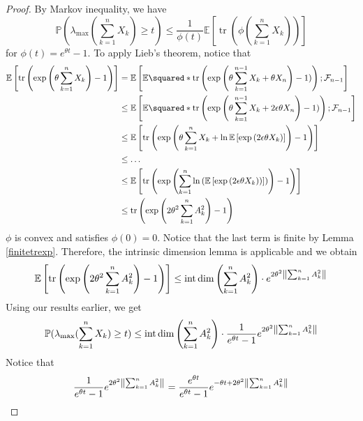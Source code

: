 \begin{proof}
    By Markov inequality, we have 
    \[ \mathbb{P}(\lambda_{\text{max}} (\sum_{k=1}^{n}X_k) \geq t) \leq \frac{1}{\phi(t)} \mathbb{E}\left[\operatorname{tr}\left(\phi(\sum_{k=1}^{n}X_k)\right)\right] \]
    for \( \phi(t) = e^{\theta t}-1\). To apply Lieb's theorem, notice that
    \begin{align*}
      \mathbb{E}\left[\operatorname{tr}\left(\operatorname{exp}\left(\theta \sum_{k=1}^{n} X_k\right)-1\right)\right] &= \mathbb{E}\left[ \mathbb{E}\squared*{\operatorname{tr}\left(\operatorname{exp}\left(\theta \sum_{k=1}^{n-1}X_k+\theta X_n\right)-1)\right);\mathcal{F}_{n-1}}\right] \\
      &\leq \mathbb{E}\left[ \mathbb{E}\squared*{\operatorname{tr}\left(\operatorname{exp}\left(\theta \sum_{k=1}^{n-1}X_k+2 \epsilon \theta X_n\right)-1)\right);\mathcal{F}_{n-1}}\right] \\                                      & \leq \mathbb{E}\left[\operatorname{tr}\left(\operatorname{exp}\left(\theta \sum_{k=1}^{n}X_k+ \operatorname{ln} \mathbb{E}\left[\operatorname{exp}\left(2 \epsilon\theta X_k\right)\right]\right)-1\right)\right] \\
                      & \leq \dots \\
                      & \leq \mathbb{E}\left[\operatorname{tr}\left(\operatorname{exp}\left(\sum_{k=1}^{n} \operatorname{ln}\left(\mathbb{E}\left[\operatorname{exp}\left(2 \epsilon\theta X_k)\right)\right]\right)\right)-1\right)\right] \\
                      & \leq \operatorname{tr}\left(\operatorname{exp}\left({2}\theta^{2}\sum_{k=1}^{n}A_k^{2}\right)-1\right)
    \end{align*}
    \( \phi \) is convex and satisfies \( \phi(0)=0 \). Notice that the last term is finite by Lemma \ref{finitetrexp}. Therefore, the intrinsic dimension lemma is applicable and we obtain
  \[ \mathbb{E}\left[\operatorname{tr}\left(\operatorname{exp}\left({2}\theta^{2}\sum_{k=1}^{n}A_k^{2}\right)-1\right)\right] \leq \operatorname{int\, dim}\left(\sum_{k=1}^{n}A_k^{2}\right) \cdot e^{{2} \theta^{2 }\norm{\sum_{k=1}^{n}A_k^{2}}_{}} \] 
    Using our results earlier, we get
    \[ \mathbb{P}(\lambda_{\text{max}} (\sum_{k=1}^{n}X_k) \geq t) \leq \operatorname{int\, dim}\left(\sum_{k=1}^{n}A_k^{2}\right) \cdot \frac{1}{e^{\theta t}-1} e^{{2}\theta^{2}\norm{\sum_{k=1}^{n}A_k^{2}}_{}} \]
    Notice that 
    \[ \frac{1}{e^{\theta t}-1} e^{{2}\theta^{2} \norm{\sum_{k=1}^{n}A_k^{2}}_{}} = \frac{e^{\theta t}}{e^{\theta t}-1} e^{-\theta t+{2}\theta^{2} \norm{\sum_{k=1}^{n}A_k^{2}}_{}} \]

\end{proof}
